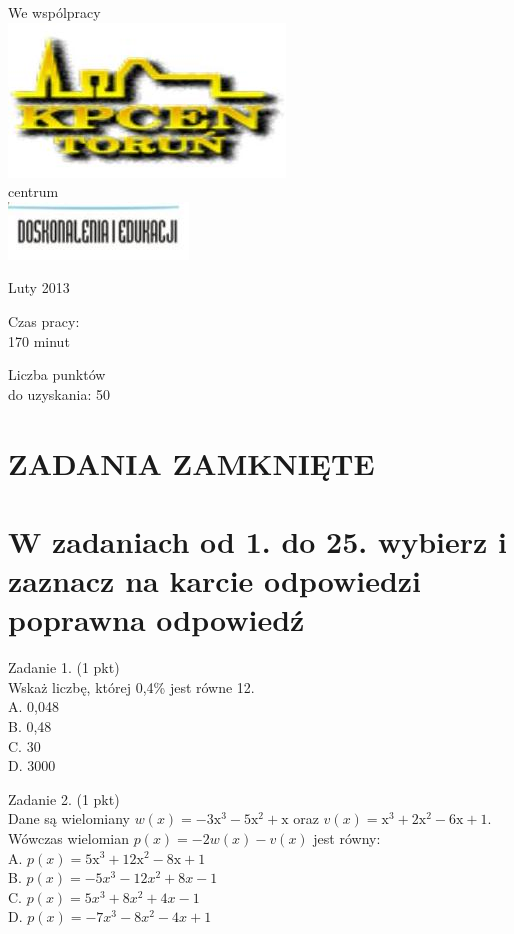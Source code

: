 \documentclass[10pt]{article}
\begin{document}
We wspólpracy\\
\includegraphics[max width=\textwidth, center]{2024_11_21_9a9f600c3b3af5013d80g-01}\\
centrum\\
\includegraphics[max width=\textwidth, center]{2024_11_21_9a9f600c3b3af5013d80g-01(1)}

Luty 2013

Czas pracy:\\
170 minut

Liczba punktów\\
do uzyskania: 50

\section*{ZADANIA ZAMKNIĘTE}
\section*{W zadaniach od 1. do 25. wybierz i zaznacz na karcie odpowiedzi poprawna odpowiedź}
Zadanie 1. (1 pkt)\\
Wskaż liczbę, której 0,4\% jest równe 12.\\
A. 0,048\\
B. 0,48\\
C. 30\\
D. 3000

Zadanie 2. (1 pkt)\\
Dane są wielomiany \(w(x)=-3 \mathrm{x}^{3}-5 \mathrm{x}^{2}+\mathrm{x}\) oraz \(v(x)=\mathrm{x}^{3}+2 \mathrm{x}^{2}-6 \mathrm{x}+1\). Wówczas wielomian \(p(x)=-2 w(x)-v(x)\) jest równy:\\
A. \(p(x)=5 \mathrm{x}^{3}+12 \mathrm{x}^{2}-8 \mathrm{x}+1\)\\
B. \(p(x)=-5 x^{3}-12 x^{2}+8 x-1\)\\
C. \(p(x)=5 x^{3}+8 x^{2}+4 x-1\)\\
D. \(p(x)=-7 x^{3}-8 x^{2}-4 x+1\)
\end{document}
